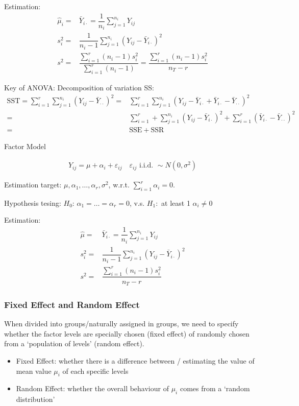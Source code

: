 Estimation:
\begin{align}
    \hat{\mu }_i=&\bar{Y}_{i\cdot}=\dfrac{1}{n_i}\sum_{j=1}^{n_i}Y_{ij}\\
    s_i^2=&\dfrac{1}{n_i-1}\sum_{j=1}^{n_i}(Y_{ij}-\bar{Y}_{i\cdot})^2\\
    s^2=&\dfrac{\sum_{i=1}^r(n_i-1)s_i^2}{\sum_{i=1}^r(n_i-1)}=\dfrac{\sum_{i=1}^r(n_i-1)s_i^2}{n_T-r}
\end{align}

Key of ANOVA: Decomposition of variation SS:
\begin{align}
    \mathrm{SST}=  \sum_{i=1}^r\sum_{j=1}^{n_i}(Y_{ij}-\bar{Y}_{\cdot\cdot})^2=&\sum_{i=1}^r\sum_{j=1}^{n_i}\left( Y_{ij}-\bar{Y}_{i\cdot}+\bar{Y}_{i\cdot}-\bar{Y}_{\cdot\cdot} \right)^2\\
    =&\sum_{i=1}^{r}+\sum_{j=1}^{n_i}(Y_{ij}-\bar{Y}_{i\cdot})^2+\sum_{i=1}^r(\bar{Y}_{i\cdot}-\bar{Y}_{\cdot\cdot})^2\\
    =&\mathrm{SSE}+\mathrm{SSR}  
\end{align}

\begin{point}
    Factor Model
\end{point}

    
    \begin{align}
        Y_{ij}=\mu+\alpha _i+\varepsilon _{ij}\quad \varepsilon _{ij}\text{ i.i.d. }\sim N(0,\sigma ^2) 
    \end{align}    

    Estimation target: $ \mu ,\alpha _1,\ldots,\alpha _r,\sigma ^2 $, w.r.t. $\sum_{i=1}^r\alpha _i=0$.

    Hypothesis tesing: $ H_0:\,\alpha _1=\ldots=\alpha _r=0 $, v.s. $ H_1: $ at least 1 $ \alpha _i\neq 0 $

    Estimation:
    \begin{align}
        \hat{\mu }=&\bar{Y}_{i\cdot }=\dfrac{1}{n_i}\sum_{j=1}^{n_i}Y_{ij}\\
        s_i^2=&\dfrac{1}{n_i-1}\sum_{j=1}^{n_i}\left(Y_{ij}-\bar{Y}_{i\cdot     }\right)^2\\
        s^2=&\dfrac{\sum_{i=1}^r(n_i-1)s_i^2}{n_T-r}
\end{align}    
    
    


\subsubsection{Fixed Effect and Random Effect}
    When divided into groups/naturally assigned in groups, we need to specify whether the factor levels are specially chosen (fixed effect) of randomly chosen from a `population of levels' (random effect). 
    \begin{itemize}[topsep=2pt,itemsep=0pt]
        \item Fixed Effect: whether there is a difference between / estimating the value of mean value $ \mu _i $ of each specific levels
        \item Random Effect: whether the overall behaviour of $ \mu _i $ comes from a `random distribution'
    \end{itemize}

